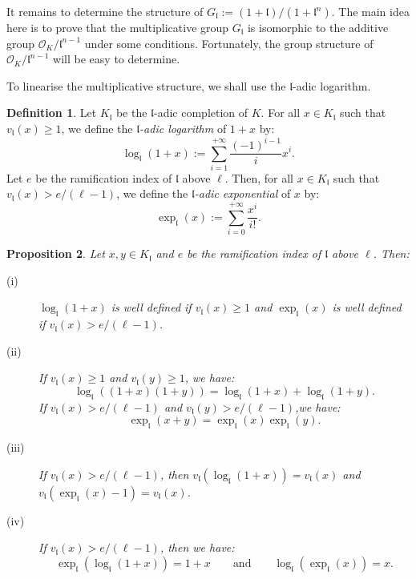 \documentclass[a4paper,10pt]{report}
\theoremstyle{definition}
\newtheorem{Definition}{Definition}[chapter]
\theoremstyle{plain}
\newtheorem{Proposition}[Definition]{Proposition}
\theoremstyle{definition}
\newcommand{\mO}{\mathcal{O}}
\renewcommand{\(}{\left(}
\renewcommand{\)}{\right)}
\newcommand{\mf}[1]{\mathfrak{#1}}
\begin{document}
It remains to determine the structure of $G_{\mf{l}}:=(1+\mf{l})/(1+\mf{l}^n)$. The main idea here is to prove that the multiplicative group $G_{\mf{l}}$ is isomorphic to the additive group $\mO_K/\mf{l}^{n-1}$ under some conditions.  Fortunately, the group structure of $\mO_K/\mf{l}^{n-1}$ will be easy to determine. 

To linearise the multiplicative structure, we shall use the $\mf{l}$-adic logarithm.

\begin{Definition}
Let $K_{\mf{l}}$ be the $\mf{l}$-adic completion of $K$. For all $x\in K_{\mf{l}}$ such that $v_{\mf{l}}(x)\geq 1$, we define the \emph{$\mf{l}$-adic logarithm} of $1+x$ by:
\[\log_{\mf{l}}(1+x):=\sum_{i=1}^{+\infty} \frac{(-1)^{i-1}}{i}x^i.\]
Let $e$ be the ramification index of $\mf{l}$ above $\ell$. Then, for all $x\in K_{\mf{l}}$ such that $v_{\mf{l}}(x)>e/(\ell-1)$, we define the \emph{$\mf{l}$-adic exponential} of $x$ by:
\[\exp_{\mf{l}}(x):=\sum_{i=0}^{+\infty}\frac{x^i}{i!}.\]
\end{Definition}

\begin{Proposition}
Let $x, y\in K_{\mf{l}}$ and $e$ be the ramification index of $\mf{l}$ above $\ell$. Then:

\begin{description}
\item[(i)] $\log_{\mf{l}}(1+x)$ is well defined if $v_{\mf{l}}(x)\geq 1$ and $\exp_{\mf{l}}(x)$ is well defined if $v_{\mf{l}}(x)>e/(\ell-1)$.
\item[(ii)] If $v_{\mf{l}}(x)\geq 1$ and $v_{\mf{l}}(y)\geq 1$, we have:
\[\log_{\mf{l}}((1+x)(1+y))=\log_{\mf{l}}(1+x)+\log_{\mf{l}}(1+y).\]
If $v_{\mf{l}}(x)> e/(\ell-1)$ and $v_{\mf{l}}(y)>e/(\ell-1)$,we have:
\[\exp_{\mf{l}}(x+y)=\exp_{\mf{l}}(x)\exp_{\mf{l}}(y).\]
\item[(iii)] If $v_{\mf{l}}(x)>e/(\ell-1)$, then $v_{\mf{l}}(\log_{\mf{l}}(1+x))=v_{\mf{l}}(x)$ and $v_{\mf{l}}(\exp_{\mf{l}}(x)-1)=v_{\mf{l}}(x)$.
\item[(iv)] If $v_{\mf{l}}(x)> e/(\ell-1)$, then we have:
\[\exp_{\mf{l}}(\log_{\mf{l}}(1+x))=1+x \qquad \mbox{and} \qquad \log_{\mf{l}}(\exp_{\mf{l}}(x))=x.\]
\end{description}
\end{Proposition}
\end{document}
